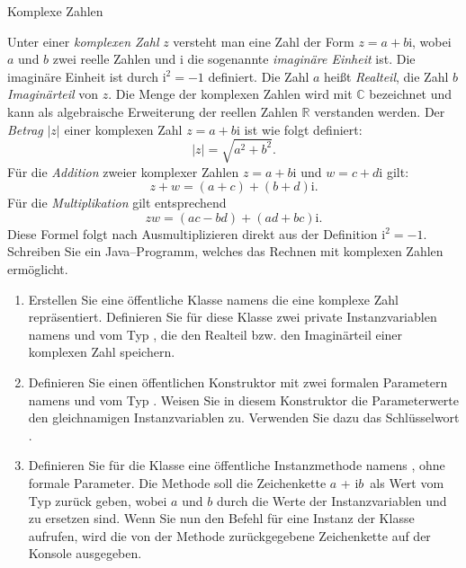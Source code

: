 \begin{exercise}{Komplexe Zahlen}



\begin{body}
Unter einer \emph{komplexen Zahl} $z$ versteht man eine Zahl der Form $z = a + b\mathrm{i}$, wobei $a$ und $b$ zwei reelle Zahlen und $\mathrm{i}$ die sogenannte \emph{imaginäre Einheit} ist.
Die imaginäre Einheit ist durch $\mathrm{i}^2 = -1$ definiert.
Die Zahl $a$ heißt \emph{Realteil}, die Zahl $b$ \emph{Imaginärteil} von $z$.
Die Menge der komplexen Zahlen wird mit $\mathbb{C}$ bezeichnet und kann als algebraische Erweiterung der reellen Zahlen $\mathbb{R}$ verstanden werden.
Der \emph{Betrag} $\lvert z\rvert$ einer komplexen Zahl $z = a + b\mathrm{i}$ ist wie folgt definiert:
\begin{equation*}
\lvert z \rvert = \sqrt{a^2 + b^2}.
\end{equation*}
Für die \emph{Addition} zweier komplexer Zahlen $z = a + b\mathrm{i}$ und $w = c + d\mathrm{i}$ gilt: 
\begin{equation*}
z + w =(a+c) + (b+d)\mathrm{i}.
\end{equation*}
Für die \emph{Multiplikation} gilt entsprechend
\begin{equation*}
z w =(ac - bd) + (ad + bc)\mathrm{i}.
\end{equation*}
Diese Formel folgt nach Ausmultiplizieren direkt aus der Definition $\mathrm{i}^2 = -1$.
Schreiben Sie ein Java--Programm, welches das Rechnen mit komplexen Zahlen ermöglicht.

\begin{enumerate}
\item Erstellen Sie eine öffentliche Klasse namens  die eine komplexe Zahl repräsentiert.
Definieren Sie für diese Klasse zwei private Instanzvariablen namens  und  vom Typ , die den Realteil bzw. den Imaginärteil einer komplexen Zahl speichern.

\item Definieren Sie einen öffentlichen Konstruktor mit zwei formalen Parametern namens  und  vom Typ .
Weisen Sie in diesem Konstruktor die Parameterwerte den gleichnamigen Instanzvariablen zu.
Verwenden Sie dazu das Schlüsselwort .

\item Definieren Sie für die Klasse  eine öffentliche Instanzmethode namens , ohne formale Parameter.
Die Methode soll die Zeichenkette \glqq $a$ + i$b$\grqq\ als Wert vom Typ  zurück geben, wobei $a$ und $b$ durch die Werte der Instanzvariablen  und  zu ersetzen sind.
Wenn Sie nun den Befehl  für eine Instanz  der Klasse  aufrufen, wird die von der Methode  zurückgegebene Zeichenkette auf der Konsole ausgegeben.


\end{enumerate}
\end{body}
\end{exercise}
